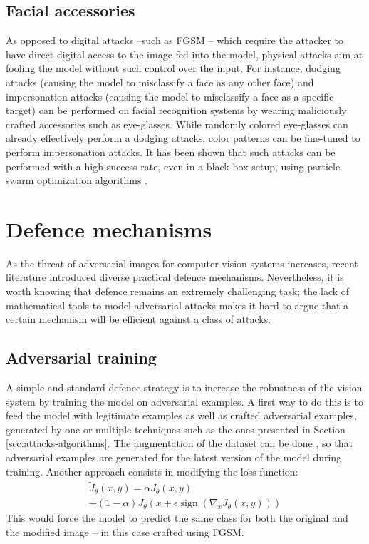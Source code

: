 \documentclass[twocolumn]{../../cs-classes/cs-classes}
\DeclareMathOperator*{\sign}{sign}
\begin{document}
\subsection{Facial accessories}
As opposed to digital attacks --such as FGSM -- which require the attacker to have direct digital access to the image fed into the model, physical attacks aim at fooling the model without such control over the input. For instance, dodging attacks (causing the model to misclassify a face as any other face) and impersonation attacks (causing the model to misclassify a face as a specific target) can be performed on facial recognition systems by wearing maliciously crafted accessories such as eye-glasses. While randomly colored eye-glasses can already effectively perform a dodging attacks, color patterns can be fine-tuned to perform impersonation attacks. It has been shown that such attacks can be performed with a high success rate, even in a black-box setup, using particle swarm optimization algorithms \cite{sharif2016accessorize}.

\section{Defence mechanisms}
As the threat of adversarial images for computer vision systems increases, recent literature introduced diverse practical defence mechanisms. Nevertheless, it is worth knowing that defence remains an extremely challenging task; the lack of mathematical tools to model adversarial attacks makes it hard to argue that a certain mechanism will be efficient against a class of attacks.

\subsection{Adversarial training}
A simple and standard defence strategy is to increase the robustness of the vision system by training the model on adversarial examples. A first way to do this is to feed the model with legitimate examples as well as crafted adversarial examples, generated by one or multiple techniques such as the ones presented in Section \ref{sec:attacks-algorithms}. The augmentation of the dataset can be done , so that adversarial examples are generated for the latest version of the model during training. Another approach \cite{goodfellow2014explaining} consists in modifying the loss function:
\begin{multline*}
    \tilde{J}_\theta(x, y) = \alpha J_\theta(x, y) \\+ (1-\alpha)J_\theta\left(x+\epsilon\sign\left(\nabla_x J_\theta(x, y)\right)\right)
\end{multline*}
This would force the model to predict the same class for both the original and the modified image -- in this case crafted using FGSM.
\end{document}
